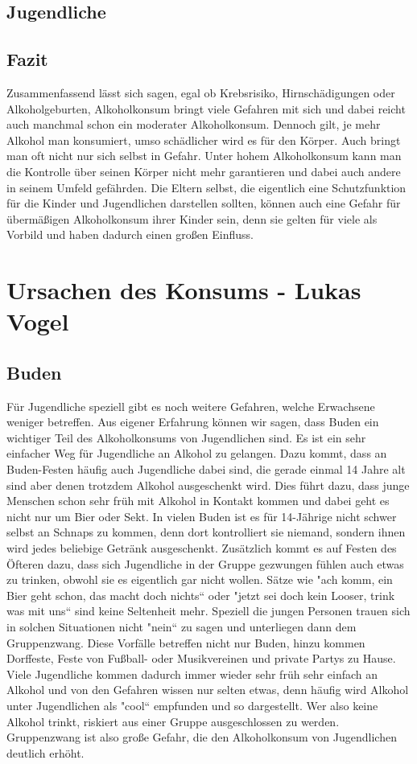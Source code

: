 \documentclass[12pt]{article}
\begin{document}
\subsection{Jugendliche}

\subsection{Fazit}
Zusammenfassend lässt sich sagen, egal ob Krebsrisiko, Hirnschädigungen oder Alkoholgeburten, Alkoholkonsum bringt viele Gefahren mit sich und dabei reicht auch manchmal schon ein moderater Alkoholkonsum. Dennoch gilt, je mehr Alkohol man konsumiert, umso schädlicher wird es für den Körper. Auch bringt man oft nicht nur sich selbst in Gefahr. Unter hohem Alkoholkonsum kann man die Kontrolle über seinen Körper nicht mehr garantieren und dabei auch andere in seinem Umfeld gefährden. Die Eltern selbst, die eigentlich eine Schutzfunktion für die Kinder und Jugendlichen darstellen sollten, können auch eine Gefahr für übermäßigen Alkoholkonsum ihrer Kinder sein, denn sie gelten für viele als Vorbild und haben dadurch einen großen Einfluss. 
\section{Ursachen des Konsums \footnotesize{- Lukas Vogel}}
\subsection{Buden}
Für Jugendliche speziell gibt es noch weitere Gefahren, welche Erwachsene weniger betreffen. Aus eigener Erfahrung können wir sagen, dass Buden ein wichtiger Teil des Alkoholkonsums von Jugendlichen sind. Es ist ein sehr einfacher Weg für Jugendliche an Alkohol zu gelangen. Dazu kommt, dass an Buden-Festen häufig auch Jugendliche dabei sind, die gerade einmal 14 Jahre alt sind aber denen trotzdem Alkohol ausgeschenkt wird. Dies führt dazu, dass junge Menschen schon sehr früh mit Alkohol in Kontakt kommen und dabei geht es nicht nur um Bier oder Sekt. In vielen Buden ist es für 14-Jährige nicht schwer selbst an Schnaps zu kommen, denn dort kontrolliert sie niemand, sondern ihnen wird jedes beliebige Getränk ausgeschenkt. Zusätzlich kommt es auf Festen des Öfteren dazu, dass sich Jugendliche in der Gruppe gezwungen fühlen auch etwas zu trinken, obwohl sie es eigentlich gar nicht wollen. Sätze wie "ach komm, ein Bier geht schon, das macht doch nichts“ oder "jetzt sei doch kein Looser, trink was mit uns“ sind keine Seltenheit mehr. Speziell die jungen Personen trauen sich in solchen Situationen nicht "nein“ zu sagen und unterliegen dann dem Gruppenzwang. Diese Vorfälle betreffen nicht nur Buden, hinzu kommen Dorffeste, Feste von Fußball- oder Musikvereinen und private Partys zu Hause. Viele Jugendliche kommen dadurch immer wieder sehr früh sehr einfach an Alkohol und von den Gefahren wissen nur selten etwas, denn häufig wird Alkohol unter Jugendlichen als "cool“ empfunden und so dargestellt. Wer also keine Alkohol trinkt, riskiert aus einer Gruppe ausgeschlossen zu werden. Gruppenzwang ist also große Gefahr, die den Alkoholkonsum von Jugendlichen deutlich erhöht.\\
\end{document}
